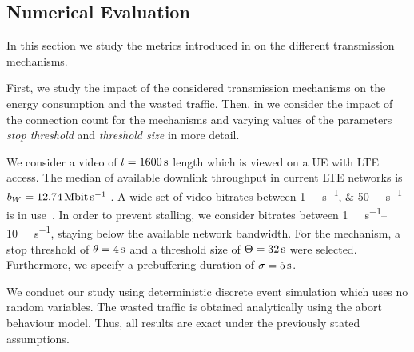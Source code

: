 \subsection{Numerical Evaluation}\label{sec:application:lte_video:numerical_evaluation}

In this section we study the metrics introduced in  on the different transmission mechanisms.

First, we study the impact of the considered transmission mechanisms on the energy consumption and the wasted traffic. 
Then, in  we consider the impact of the connection count for the \streaming mechanisms and varying values of the parameters \emph{stop threshold} \bufferlower and \emph{threshold size} \buffersize in more detail.

We consider a video of \(l=\SI{1600}{\second}\) length which is viewed on a \gls{UE} with \gls{LTE} access.
The median of available downlink throughput in current \gls{LTE} networks is \(\bandwidth = \SI{12.74}{\mega\bit\per\second}\) \cite{Huang2012}.
A wide set of video bitrates between \SIlist{1;50}{\mega\bit\per\second} is in use~\cite{YouTube2013}.
In order to prevent stalling, we consider bitrates between \SIrange{1}{10}{\mega\bit\per\second}, staying below the available network bandwidth.
For the \streaming mechanism, a stop threshold of \(\theta = \SI{4}{\second}\) and a threshold size of \(\Theta = \SI{32}{\second}\) were selected.
Furthermore, we specify a prebuffering duration of \(\sigma = \SI{5}{\second}\).

We conduct our study using deterministic discrete event simulation which uses no random variables.
The wasted traffic is obtained analytically using the abort behaviour model.
Thus, all results are exact under the previously stated assumptions.

